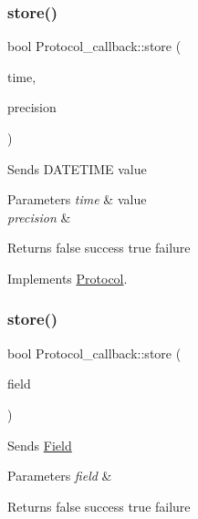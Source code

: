 \subsubsection{\texorpdfstring{store()}{store()}\hspace{0.1cm}{\footnotesize\ttfamily [4/5]}}
{\footnotesize\ttfamily bool Protocol\+\_\+callback\+::store (\begin{DoxyParamCaption}\item[{M\+Y\+S\+Q\+L\+\_\+\+T\+I\+ME $\ast$}]{time,  }\item[{uint}]{precision }\end{DoxyParamCaption})\hspace{0.3cm}{\ttfamily [virtual]}}

Sends D\+A\+T\+E\+T\+I\+ME value


\begin{DoxyParams}{Parameters}
{\em time} & value \\
\hline
{\em precision} & \\
\hline
\end{DoxyParams}
\begin{DoxyReturn}{Returns}
false success true failure 
\end{DoxyReturn}


Implements \mbox{\hyperlink{classProtocol}{Protocol}}.

\mbox{\label{classProtocol__callback_a6df3f044f7dcab0886ba40625b018a27}} 
\subsubsection{\texorpdfstring{store()}{store()}\hspace{0.1cm}{\footnotesize\ttfamily [5/5]}}
{\footnotesize\ttfamily bool Protocol\+\_\+callback\+::store (\begin{DoxyParamCaption}\item[{\mbox{\hyperlink{classProto__field}{Proto\+\_\+field}} $\ast$}]{field }\end{DoxyParamCaption})\hspace{0.3cm}{\ttfamily [virtual]}}

Sends \mbox{\hyperlink{classField}{Field}}


\begin{DoxyParams}{Parameters}
{\em field} & \\
\hline
\end{DoxyParams}
\begin{DoxyReturn}{Returns}
false success true failure 
\end{DoxyReturn}


